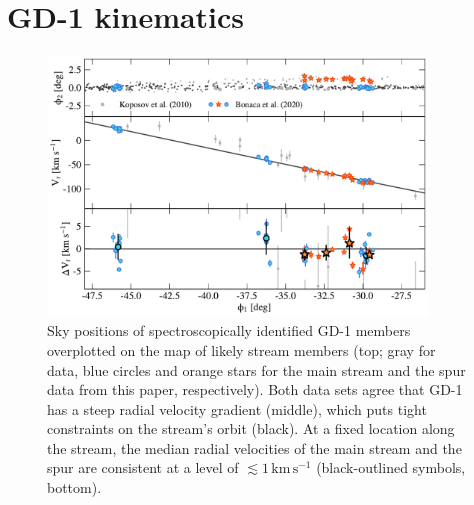 \documentclass[twocolumn]{aastex63}
\newcommand{\kms}{\ensuremath{\textrm{km}\,\textrm{s}^{-1}}}
\newcommand{\feh}{\ensuremath{\textrm{[Fe/H]}}}
\newcommand{\afe}{\ensuremath{\textrm{[$\alpha$/Fe]}}}
\begin{document}


\section{GD-1 kinematics}
\label{sec:kinematics}

\begin{figure}
\begin{center}
\includegraphics[width=0.9\textwidth]{gd1_kinematics.pdf}
\end{center}
\caption{Sky positions of spectroscopically identified GD-1 members overplotted on the map of likely stream members (top; gray for \citet{koposov2010} data, blue circles and orange stars for the main stream and the spur data from this paper, respectively).
Both data sets agree that GD-1 has a steep radial velocity gradient (middle), which puts tight constraints on the stream's orbit (black).
At a fixed location along the stream, the median radial velocities of the main stream and the spur are consistent at a level of $\lesssim1\,\kms$ (black-outlined symbols, bottom).
}
\label{fig:vr}
\end{figure}
\end{document}
